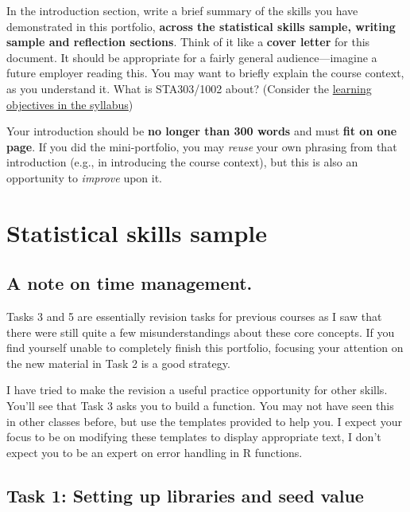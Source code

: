 \documentclass[
  openany]{book}
\begin{document}
In the introduction section, write a brief summary of the skills you have demonstrated in this portfolio, \textbf{across the statistical skills sample, writing sample and reflection sections}. Think of it like a \textbf{cover letter} for this document. It should be appropriate for a fairly general audience---imagine a future employer reading this. You may want to briefly explain the course context, as you understand it. What is STA303/1002 about? (Consider the \href{https://sta303-bolton.github.io/sta303-w22-courseguide/syllabus.html\#learning-objectives}{learning objectives in the syllabus})

Your introduction should be \textbf{no longer than 300 words} and must \textbf{fit on one page}. If you did the mini-portfolio, you may \emph{reuse} your own phrasing from that introduction (e.g., in introducing the course context), but this is also an opportunity to \emph{improve} upon it.

\hypertarget{statistical-skills-sample-1}{%
\section{Statistical skills sample}\label{statistical-skills-sample-1}}

\hypertarget{a-note-on-time-management.}{%
\subsection{A note on time management.}\label{a-note-on-time-management.}}

Tasks 3 and 5 are essentially revision tasks for previous courses as I saw that there were still quite a few misunderstandings about these core concepts. If you find yourself unable to completely finish this portfolio, focusing your attention on the new material in Task 2 is a good strategy.

I have tried to make the revision a useful practice opportunity for other skills. You'll see that Task 3 asks you to build a function. You may not have seen this in other classes before, but use the templates provided to help you. I expect your focus to be on modifying these templates to display appropriate text, I don't expect you to be an expert on error handling in R functions.

\hypertarget{task-1-setting-up-libraries-and-seed-value}{%
\subsection{Task 1: Setting up libraries and seed value}\label{task-1-setting-up-libraries-and-seed-value}}
\end{document}
